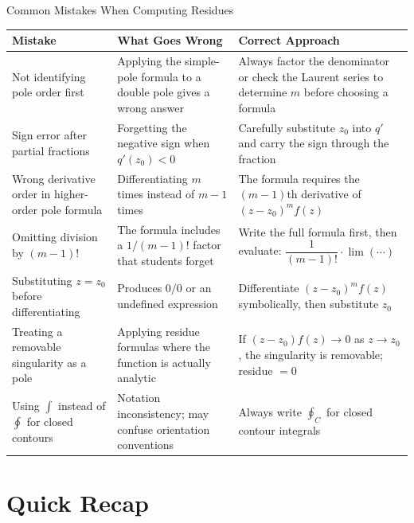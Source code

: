 \documentclass[12pt,a4paper]{article}
\begin{document}
\begin{mistakebox}{Common Mistakes When Computing Residues}
\begin{tabular}{@{}>{\raggedright}p{3.8cm} >{\raggedright}p{4.5cm} >{\raggedright\arraybackslash}p{5.5cm}@{}}
\toprule
\textbf{Mistake} & \textbf{What Goes Wrong} & \textbf{Correct Approach} \\
\midrule
Not identifying pole order first & Applying the simple-pole formula to a double pole gives a wrong answer & Always factor the denominator or check the Laurent series to determine $m$ before choosing a formula \\
\midrule
Sign error after partial fractions & Forgetting the negative sign when $q'(z_0) < 0$ & Carefully substitute $z_0$ into $q'$ and carry the sign through the fraction \\
\midrule
Wrong derivative order in higher-order pole formula & Differentiating $m$ times instead of $m-1$ times & The formula requires the $(m-1)$th derivative of $(z-z_0)^m f(z)$ \\
\midrule
Omitting division by $(m-1)!$ & The formula includes a $1/(m-1)!$ factor that students forget & Write the full formula first, then evaluate: $\dfrac{1}{(m-1)!}\cdot\lim(\cdots)$ \\
\midrule
Substituting $z=z_0$ before differentiating & Produces $0/0$ or an undefined expression & Differentiate $(z-z_0)^m f(z)$ symbolically, then substitute $z_0$ \\
\midrule
Treating a removable singularity as a pole & Applying residue formulas where the function is actually analytic & If $(z-z_0)f(z)\to 0$ as $z\to z_0$, the singularity is removable; residue $=0$ \\
\midrule
Using $\int$ instead of $\oint$ for closed contours & Notation inconsistency; may confuse orientation conventions & Always write $\oint_C$ for closed contour integrals \\
\bottomrule
\end{tabular}
\end{mistakebox}

\section{Quick Recap}
\end{document}
